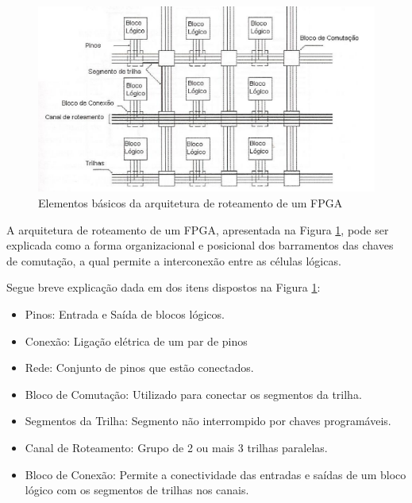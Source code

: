 \documentclass[
	11pt,				%
	openany,			%
	oneside,
	a4paper,			%
	chapter=TITLE,		%
	section=TITLE,		%
	english,			%
	brazil				%
	]{abntex2}
\begin{document}
\begin{figure}[htb]
	\caption{\label{fig_roteamentofpga}Elementos básicos da arquitetura de roteamento de um FPGA}
	\begin{center}
	    \includegraphics[scale=0.8]{arquiteturaroteamento.PNG}
	\end{center}
\end{figure}  
  
  A arquitetura de roteamento de um FPGA, apresentada na Figura \ref{fig_roteamentofpga}, pode ser explicada como a forma organizacional e posicional dos barramentos das chaves de comutação, a qual permite a interconexão entre as células lógicas. \cite{logicaprogramavel}
	
    Segue breve explicação dada em \cite{logicaprogramavel} dos itens dispostos na Figura \ref{fig_roteamentofpga}:
    
\begin{itemize}
\item Pinos: Entrada e Saída de blocos lógicos.
\item Conexão: Ligação elétrica de um par de pinos
\item Rede: Conjunto de pinos que estão conectados.
\item Bloco de Comutação: Utilizado para conectar os segmentos da trilha.
\item Segmentos da Trilha: Segmento não interrompido por chaves programáveis.
\item Canal de Roteamento: Grupo de 2 ou mais 3 trilhas paralelas.
\item Bloco de Conexão: Permite a conectividade das entradas e saídas de um bloco lógico
com os segmentos de trilhas nos canais.
\end{itemize}
\end{document}
